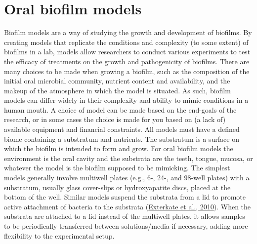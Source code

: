 \documentclass[
  b5paper,
]{book}
\begin{document}
\hypertarget{background-biofilm-models}{%
\section{Oral biofilm models}\label{background-biofilm-models}}

Biofilm models are a way of studying the growth and development of
biofilms. By creating models that replicate the conditions and
complexity (to some extent) of biofilms in a lab, models allow
researchers to conduct various experiments to test the efficacy of
treatments on the growth and pathogenicity of biofilms. There are many
choices to be made when growing a biofilm, such as the composition of
the initial oral microbial community, nutrient content and availability,
and the makeup of the atmosphere in which the model is situated. As
such, biofilm models can differ widely in their complexity and ability
to mimic conditions in a human mouth. A choice of model can be made
based on the end-goals of the research, or in some cases the choice is
made for you based on (a lack of) available equipment and financial
constraints. All models must have a defined biome containing a
substratum and nutrients. The substratum is a surface on which the
biofilm is intended to form and grow. For oral biofilm models the
environment is the oral cavity and the substrata are the teeth, tongue,
mucosa, or whatever the model is the biofilm supposed to be mimicking.
The simplest models generally involve multiwell plates (e.g., 6-, 24-,
and 98-well plates) with a substratum, usually glass cover-slips or
hydroxyapatite discs, placed at the bottom of the well. Similar models
suspend the substrata from a lid to promote active attachment of
bacteria to the substrata
(\protect\hyperlink{ref-extercateAAA2010}{Exterkate et al., 2010}). When
the substrata are attached to a lid instead of the multiwell plates, it
allows samples to be periodically transferred between solutions/media if
necessary, adding more flexibility to the experimental setup.
\end{document}
